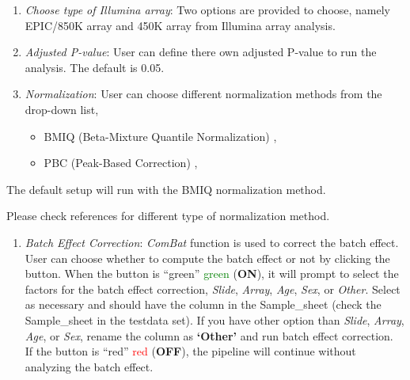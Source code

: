 \documentclass[
  a4paper,
  DIV=11,
  numbers=noendperiod,
  oneside,
  open=any]{scrreport}
\providecommand{\tightlist}{%
  \setlength{\itemsep}{0pt}\setlength{\parskip}{0pt}}\usepackage{longtable,booktabs,array}
\begin{document}
\begin{enumerate}
\def\labelenumi{\arabic{enumi}.}
\item
  \emph{Choose type of Illumina array}: Two options are provided to
  choose, namely EPIC/850K array and 450K array from Illumina array
  analysis.
\item
  \emph{Adjusted P-value}: User can define there own adjusted P-value to
  run the analysis. The default is 0.05.
\item
  \emph{Normalization}: User can choose different normalization methods
  from the drop-down list,

  \begin{itemize}
  \tightlist
  \item
    BMIQ (Beta-Mixture Quantile Normalization)
    \autocite{teschendorff2013beta},
  \item
    PBC (Peak-Based Correction) \autocite{dedeurwaerder2011evaluation},
  \end{itemize}
\end{enumerate}

The default setup will run with the BMIQ normalization method.

\begin{tcolorbox}[enhanced jigsaw, opacityback=0, toprule=.15mm, bottomtitle=1mm, colback=white, rightrule=.15mm, breakable, coltitle=black, colbacktitle=quarto-callout-tip-color!10!white, toptitle=1mm, arc=.35mm, colframe=quarto-callout-tip-color-frame, bottomrule=.15mm, opacitybacktitle=0.6, titlerule=0mm, leftrule=.75mm, title=\textcolor{quarto-callout-tip-color}{\faLightbulb}\hspace{0.5em}{Tip}, left=2mm]

Please check references for different type of normalization method.

\end{tcolorbox}

\begin{enumerate}
\def\labelenumi{\arabic{enumi}.}
\setcounter{enumi}{3}
\tightlist
\item
  \emph{Batch Effect Correction}: \emph{ComBat} function is used to
  correct the batch effect. User can choose whether to compute the batch
  effect or not by clicking the button. When the button is {``green''}
  \textcolor{green}{green} (\textbf{ON}), it will prompt to select the
  factors for the batch effect correction, \emph{Slide}, \emph{Array},
  \emph{Age}, \emph{Sex}, or \emph{Other}. Select as necessary and
  should have the column in the Sample\_sheet (check the Sample\_sheet
  in the testdata set). If you have other option than \emph{Slide},
  \emph{Array}, \emph{Age}, or \emph{Sex}, rename the column as
  \textbf{`Other'} and run batch effect correction.\\
  If the button is {``red''} \textcolor{red}{red} (\textbf{OFF}), the
  pipeline will continue without analyzing the batch effect.
\end{enumerate}
\end{document}
